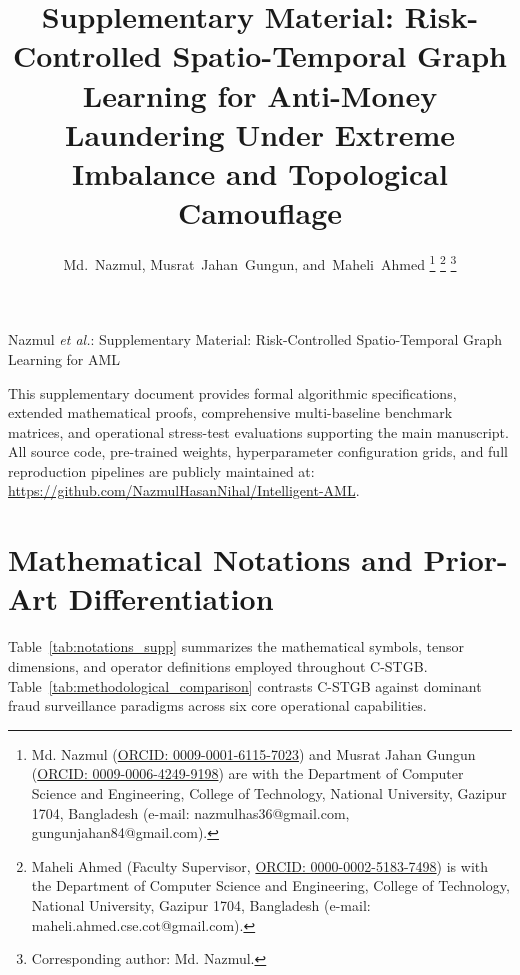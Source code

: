 \documentclass[journal,twoside]{IEEEtran}
\begin{document}
\title{Supplementary Material: Risk-Controlled Spatio-Temporal Graph Learning for Anti-Money Laundering Under Extreme Imbalance and Topological Camouflage}

\author{Md.~Nazmul,
       Musrat~Jahan~Gungun,
       and~Maheli~Ahmed%
\thanks{Md. Nazmul (\href{https://orcid.org/0009-0001-6115-7023}{ORCID: 0009-0001-6115-7023}) and Musrat Jahan Gungun (\href{https://orcid.org/0009-0006-4249-9198}{ORCID: 0009-0006-4249-9198}) are with the Department of Computer Science and Engineering, College of Technology, National University, Gazipur 1704, Bangladesh (e-mail: nazmulhas36@gmail.com, gungunjahan84@gmail.com).}%
\thanks{Maheli Ahmed (Faculty Supervisor, \href{https://orcid.org/0000-0002-5183-7498}{ORCID: 0000-0002-5183-7498}) is with the Department of Computer Science and Engineering, College of Technology, National University, Gazipur 1704, Bangladesh (e-mail: maheli.ahmed.cse.cot@gmail.com).}%
\thanks{Corresponding author: Md. Nazmul.}%
}

%
{Nazmul \MakeLowercase{\textit{et al.}}: Supplementary Material: Risk-Controlled Spatio-Temporal Graph Learning for AML}

\maketitle

\appendices

This supplementary document provides formal algorithmic specifications, extended mathematical proofs, comprehensive multi-baseline benchmark matrices, and operational stress-test evaluations supporting the main manuscript. All source code, pre-trained weights, hyperparameter configuration grids, and full reproduction pipelines are publicly maintained at: \url{https://github.com/NazmulHasanNihal/Intelligent-AML}.

\section{Mathematical Notations and Prior-Art Differentiation}
\label{sec:notations_supp}

Table~\ref{tab:notations_supp} summarizes the mathematical symbols, tensor dimensions, and operator definitions employed throughout C-STGB. Table~\ref{tab:methodological_comparison} contrasts C-STGB against dominant fraud surveillance paradigms across six core operational capabilities.
\end{document}
